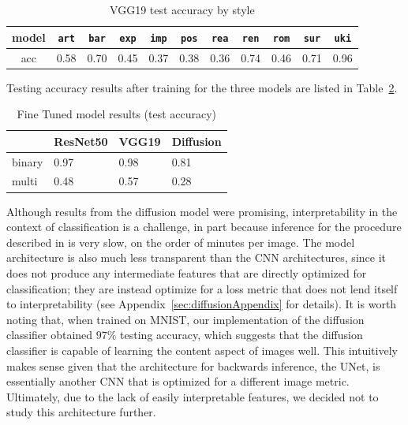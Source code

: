 \documentclass[twocolumn]{article}
\begin{document}
\begin{table}[ht]
    \centering
    \begin{tabular}{|c|c|c|c|c|c|c|c|c|c|c|}
    \hline
    model & \verb|art| & \verb|bar| & \verb|exp| & \verb|imp| & \verb|pos| & \verb|rea| & \verb|ren| & \verb|rom| & \verb|sur| & \verb|uki| \\
    \hline
       acc  & 0.58 & 0.70 & 0.45 & 0.37 & 0.38 & 0.36 & 0.74 & 0.46 & 0.71 & 0.96 \\
    \hline
    \end{tabular}
    \caption{VGG19 test accuracy by style}
    \label{tab:vgg19_class_accuracy}
\end{table}

Testing accuracy results after training for the three models are listed in Table~\ref{tab:initial model results}. 

\begin{table}[H]
  \centering
  \label{tab:example}
  \begin{tabular}{|p{1.5cm}|p{1.5cm}|p{1.5cm}|p{1.5cm}|}
    \hline
     & ResNet50 & VGG19 & Diffusion \\
    \hline\hline
    binary & 0.97 & 0.98 & 0.81 \\
    \hline
    multi & 0.48 & 0.57 & 0.28 \\
    \hline
  \end{tabular}
  \caption{Fine Tuned model results (test accuracy)}
  \label{tab:initial model results}  
\end{table}

Although results from the diffusion model were promising, interpretability in the context of classification is a challenge, in part because inference for the procedure described in \cite{liYourDiffusionModel} is very slow, on the order of minutes per image. The model architecture is also much less transparent than the CNN architectures, since it does not produce any intermediate features that are directly optimized for classification; they are instead optimize for a loss metric that does not lend itself to interpretability (see Appendix~\ref{sec:diffusionAppendix} for details). It is worth noting that, when trained on MNIST, our implementation of the diffusion classifier obtained $97\%$ testing accuracy, which suggests that the diffusion classifier is capable of learning the content aspect of images well. This intuitively makes sense given that the architecture for backwards inference, the UNet, is essentially another CNN that is optimized for a different image metric. Ultimately, due to the lack of easily interpretable features, we decided not to study this architecture further. 
\end{document}

